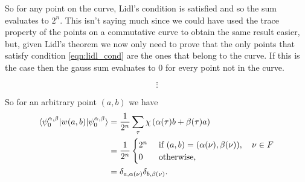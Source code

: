 \documentclass[a4paper]{article}
\begin{document}
  So for any point on the curve, Lidl's condition is
  satisfied and so the sum evaluates to $2^{n}$. This isn't
  saying much since we could have used the trace property of
  the points on a commutative curve to obtain the same
  result easier, but, given Lidl's theorem we  now only need to
  prove that the only points that satisfy condition
  \eqref{eqn:lidl_cond} are the ones that belong to the
  curve. If this is the case then the gauss
  sum evaluates to $0$ for every point not in the curve. 

  \begin{equation}
    \vdots
  \end{equation}

  So for an arbitrary point $(a,b)$ we have
  \begin{align}
    \braket{
      \psi_{0}^{\alpha,\beta}|w(a,b)|
      \psi_{0}^{\alpha,\beta}
    }
    &= \frac{1}{2^{n}}
    \sum_{\tau}^{} 
    \chi\left( \alpha(\tau)b + \beta(\tau)a \right)  \\
    &= \frac{1}{2^{n}}\begin{cases}
      2^{n} & \text{ if } (a,b) =
      (\alpha(\nu),\beta(\nu)), \quad \nu \in F \\
      0 & \text{ otherwise, }
    \end{cases} \\
    &= \delta_{a,\alpha(\nu)} \delta_{b,\beta(\nu)}.
  \end{align}
\end{document}
